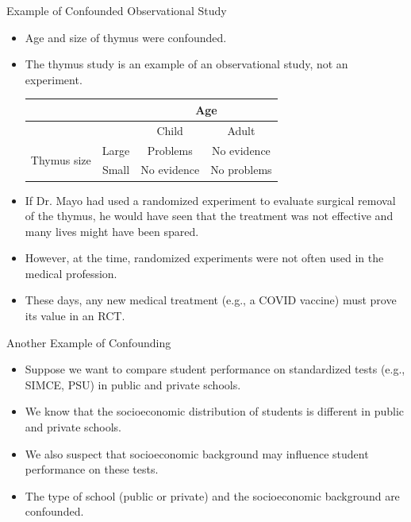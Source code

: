 \documentclass[handout]{beamer}
\begin{document}
\begin{frame}{Example of Confounded Observational Study}
\scriptsize{

\begin{itemize}


\item Age and size of thymus were confounded.

\item The thymus study is an example of an observational study, not an experiment.

\begin{table}
\center
 \begin{tabular}{|c|ccc|}  \hline
 
& & \multicolumn{2}{c|}{Age} \\ \hline
& & Child & Adult \\
\multirow{2}{*}{ Thymus size } & Large & Problems & No evidence \\ 
& Small & No evidence & No problems \\ \hline
\end{tabular} 
\end{table}

\item If Dr. Mayo had used a randomized experiment to evaluate surgical removal of the thymus, he would have seen that the treatment was not effective and many lives might have been
spared. 
\item However, at the time, randomized experiments were not often used in the medical profession.
  
\item These days, any new medical treatment (e.g., a COVID vaccine) must prove its value in an RCT.  
\end{itemize}



} 
\end{frame}

\begin{frame}{Another Example of Confounding}
\scriptsize{

\begin{itemize}

\item Suppose we want to compare student performance on standardized tests (e.g., SIMCE, PSU) in public and private schools.

\item We know that the socioeconomic distribution of students is different in public and private schools.

\item We also suspect that socioeconomic background may influence student performance on these tests.

\item The type of school (public or private) and the socioeconomic background are confounded.
  
\end{itemize}



} 
\end{frame}
\end{document}
